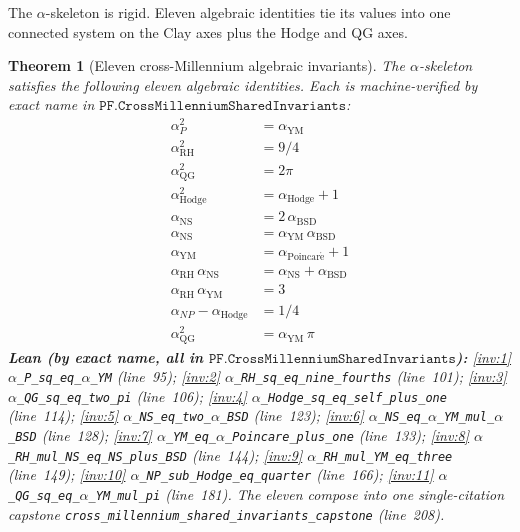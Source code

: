 \documentclass[11pt,a4paper]{article}
\theoremstyle{plain}
\newtheorem{theorem}{Theorem}[section]
\theoremstyle{definition}
\begin{document}
The $\alpha$-skeleton is rigid. Eleven algebraic identities tie its
values into one connected system on the Clay axes plus the Hodge
and QG axes.

\begin{theorem}[Eleven cross-Millennium algebraic invariants]
\label{thm:eleven-invariants}
The $\alpha$-skeleton satisfies the following eleven algebraic
identities. Each is machine-verified by exact name in
$\mathtt{PF.CrossMillenniumSharedInvariants}$:
\begin{align}
\alpha_{P}^{2} &= \alpha_{\mathrm{YM}}
  \label{inv:1} \\
\alpha_{\mathrm{RH}}^{2} &= 9/4
  \label{inv:2} \\
\alpha_{\mathrm{QG}}^{2} &= 2\pi
  \label{inv:3} \\
\alpha_{\mathrm{Hodge}}^{2} &= \alpha_{\mathrm{Hodge}} + 1
  \label{inv:4} \\
\alpha_{\mathrm{NS}} &= 2\,\alpha_{\mathrm{BSD}}
  \label{inv:5} \\
\alpha_{\mathrm{NS}} &= \alpha_{\mathrm{YM}}\,\alpha_{\mathrm{BSD}}
  \label{inv:6} \\
\alpha_{\mathrm{YM}} &= \alpha_{\mathrm{Poincar\acute e}} + 1
  \label{inv:7} \\
\alpha_{\mathrm{RH}}\,\alpha_{\mathrm{NS}} &=
  \alpha_{\mathrm{NS}} + \alpha_{\mathrm{BSD}}
  \label{inv:8} \\
\alpha_{\mathrm{RH}}\,\alpha_{\mathrm{YM}} &= 3
  \label{inv:9} \\
\alpha_{NP} - \alpha_{\mathrm{Hodge}} &= 1/4
  \label{inv:10} \\
\alpha_{\mathrm{QG}}^{2} &= \alpha_{\mathrm{YM}}\,\pi
  \label{inv:11}
\end{align}
\textbf{Lean (by exact name, all in
$\mathtt{PF.CrossMillenniumSharedInvariants}$):}
\eqref{inv:1} \texttt{$\alpha$\_P\_sq\_eq\_$\alpha$\_YM}
  (line~95);
\eqref{inv:2} \texttt{$\alpha$\_RH\_sq\_eq\_nine\_fourths}
  (line~101);
\eqref{inv:3} \texttt{$\alpha$\_QG\_sq\_eq\_two\_pi}
  (line~106);
\eqref{inv:4} \texttt{$\alpha$\_Hodge\_sq\_eq\_self\_plus\_one}
  (line~114);
\eqref{inv:5} \texttt{$\alpha$\_NS\_eq\_two\_$\alpha$\_BSD}
  (line~123);
\eqref{inv:6} \texttt{$\alpha$\_NS\_eq\_$\alpha$\_YM\_mul\_$\alpha$\_BSD}
  (line~128);
\eqref{inv:7} \texttt{$\alpha$\_YM\_eq\_$\alpha$\_Poincare\_plus\_one}
  (line~133);
\eqref{inv:8} \texttt{$\alpha$\_RH\_mul\_NS\_eq\_NS\_plus\_BSD}
  (line~144);
\eqref{inv:9} \texttt{$\alpha$\_RH\_mul\_YM\_eq\_three} (line~149);
\eqref{inv:10} \texttt{$\alpha$\_NP\_sub\_Hodge\_eq\_quarter}
  (line~166);
\eqref{inv:11} \texttt{$\alpha$\_QG\_sq\_eq\_$\alpha$\_YM\_mul\_pi}
  (line~181).
The eleven compose into one single-citation capstone
\texttt{cross\_millennium\_shared\_invariants\_capstone}
(line~208).
\end{theorem}
\end{document}
